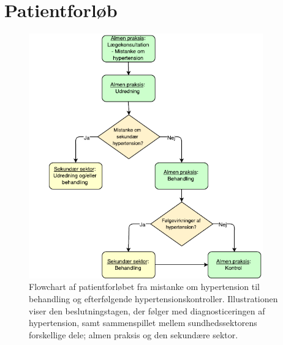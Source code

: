 \chapter{Patientforløb}

\begin{figure}[H]
\centering
\includegraphics[width=0.9\textwidth]{figures/patientforloeb3}
\caption{Flowchart af patientforløbet fra mistanke om hypertension til behandling og efterfølgende hypertensionskontroller. Illustrationen viser den beslutningstagen, der følger med diagnosticeringen af hypertension, samt sammenspillet mellem sundhedssektorens forskellige dele; almen praksis og den sekundære sektor.}
\label{fig:patientforloeb}
\end{figure}